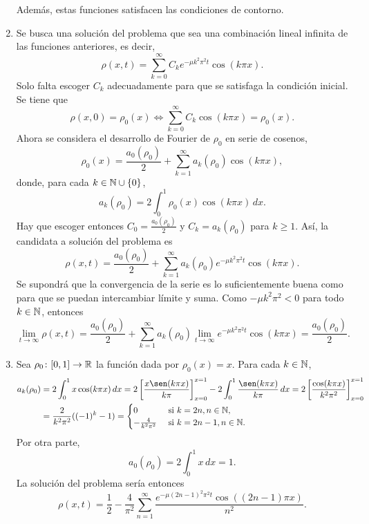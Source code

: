\documentclass[11pt]{report}
\begin{document}
\begin{solution}
\begin{enumerate}
        Además, estas funciones satisfacen las condiciones de contorno.
        \item Se busca una solución del problema que sea una combinación lineal infinita de las funciones anteriores, es decir,
        \[\rho(x,t) = \sum_{k=0}^\infty C_ke^{-\mu k^2\pi^2 t}\cos(k\pi x).\]
        Solo falta escoger $C_k$ adecuadamente para que se satisfaga la condición inicial. Se tiene que
        \[\rho(x,0) = \rho_0(x) \iff \sum_{k=0}^\infty C_k\cos(k\pi x) = \rho_0(x).\]
        Ahora se considera el desarrollo de Fourier de $\rho_0$ en serie de cosenos,
        \[\rho_0(x) = \frac{a_0(\rho_0)}{2}+\sum_{k=1}^\infty a_k(\rho_0)\cos(k\pi x),\]
        donde, para cada $k\in\mathbb N\cup\{0\}$,
        \[a_k(\rho_0) = 2\int_0^1\rho_0(x)\cos(k\pi x)\, dx.\]
        Hay que escoger entonces $C_0 = \frac{a_0(\rho_0)}{2}$ y $C_k = a_k(\rho_0)$ para $k\geq 1$. Así, la candidata a solución del problema es
        \[\rho(x,t) =\frac{a_0(\rho_0)}{2}+ \sum_{k=1}^\infty a_k(\rho_0)e^{-\mu k^2\pi^2 t}\cos(k\pi x).\]
        Se supondrá que la convergencia de la serie es lo suficientemente buena como para que se puedan intercambiar límite y suma. Como $-\mu k^2\pi^2<0$ para todo $k \in \mathbb N$, entonces
        \[\lim_{t\to\infty}\rho(x,t) = \frac{a_0(\rho_0)}{2}+ \sum_{k=1}^\infty a_k(\rho_0)\lim_{t\to\infty}e^{-\mu k^2\pi^2 t}\cos(k\pi x) = \frac{a_0(\rho_0)}{2}.\]
        \item Sea $\rho_0\colon[0,1]\to\mathbb R$ la función dada por $\rho_0(x) = x$. Para cada $k\in \mathbb N$,
        \begin{align*}
            a_k(\rho_0) &= 2\int_0^1x\cos(k\pi x)\, dx = 2\left[\frac{x\sen(k\pi x)}{k\pi}\right]_{x=0}^{x=1}-2\int_0^1\frac{\sen(k\pi x)}{k\pi}\, dx = 2\left[\frac{\cos(k\pi x)}{k^2\pi^2}\right]_{x=0}^{x=1} \\
            &= \frac{2}{k^2\pi^2}((-1)^k-1) = \begin{cases}
                0 & $ si $ k = 2n, n \in \N, \\
                - \frac{4}{k^2\pi^2} & $ si $ k = 2n-1, n \in \N. 
            \end{cases}
        \end{align*} 
        Por otra parte,
        \[a_0(\rho_0) = 2\int_0^1x\, dx = 1.\]
        La solución del problema sería entonces
        \[\rho(x,t) = \frac{1}{2}-\frac{4}{\pi^2} \sum_{n=1}^\infty\frac{e^{-\mu (2n-1)^2\pi^2 t}\cos((2n-1)\pi x)}{n^2}.\]
    \end{enumerate}


\end{solution}
\end{document}
